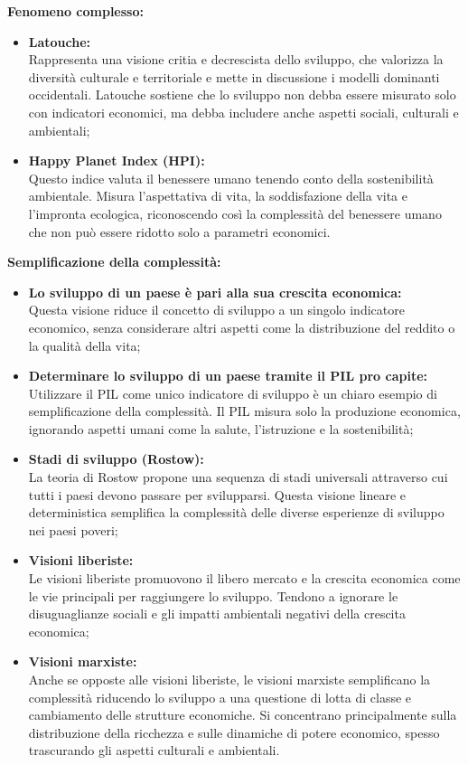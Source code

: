 \documentclass{article}
\begin{document}
\textbf{\large Fenomeno complesso:}
\begin{itemize}
    \item \textbf{Latouche:}\\
        Rappresenta una visione critia e decrescista dello sviluppo, che valorizza la diversità
        culturale e territoriale e mette in discussione i modelli dominanti occidentali.
        Latouche sostiene che lo sviluppo non debba essere misurato solo con indicatori
        economici, ma debba includere anche aspetti sociali, culturali e ambientali;
    \item \textbf{Happy Planet Index (HPI):}\\
        Questo indice valuta il benessere umano tenendo conto della sostenibilità ambientale.
        Misura l'aspettativa di vita, la soddisfazione della vita e l'impronta ecologica,
        riconoscendo così la complessità del benessere umano che non può essere ridotto solo
        a parametri economici.
\end{itemize}

\textbf{\large Semplificazione della complessità:}
\begin{itemize}
    \item \textbf{Lo sviluppo di un paese è pari alla sua crescita economica:}\\
        Questa visione riduce il concetto di sviluppo a un singolo indicatore economico,
        senza considerare altri aspetti come la distribuzione del reddito o la qualità della
        vita;
    \item \textbf{Determinare lo sviluppo di un paese tramite il PIL pro capite:}\\
        Utilizzare il PIL come unico indicatore di sviluppo è un chiaro esempio di
        semplificazione della complessità. Il PIL misura solo la produzione economica,
        ignorando aspetti umani come la salute, l'istruzione e la sostenibilità;
    \item \textbf{Stadi di sviluppo (Rostow):}\\
        La teoria di Rostow propone una sequenza di stadi universali attraverso cui tutti i
        paesi devono passare per svilupparsi. Questa visione lineare e deterministica
        semplifica la complessità delle diverse esperienze di sviluppo nei paesi poveri;
    \item \textbf{Visioni liberiste:}\\
        Le visioni liberiste promuovono il libero mercato e la crescita economica come le vie
        principali per raggiungere lo sviluppo. Tendono a ignorare le disuguaglianze sociali e
        gli impatti ambientali negativi della crescita economica;
    \item \textbf{Visioni marxiste:}\\
        Anche se opposte alle visioni liberiste, le visioni marxiste semplificano la
        complessità riducendo lo sviluppo a una questione di lotta di classe e cambiamento
        delle strutture economiche. Si concentrano principalmente sulla distribuzione della
        ricchezza e sulle dinamiche di potere economico, spesso trascurando gli aspetti 
        culturali e ambientali.
\end{itemize}
\pagebreak
\end{document}
